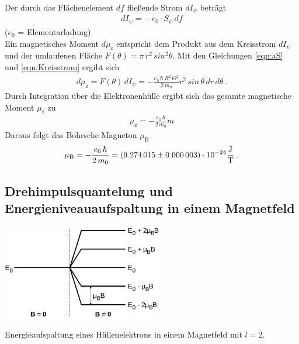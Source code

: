 Der durch das Flächenelement $df$ fließende Strom $dI_\psi$ beträgt
\begin{align}\label{eqn:Kreisstrom} %
	dI_\psi = -\,e_0\cdot S_\psi\,df
\end{align}
\hfill \footnotesize{($e_0$ = Elementarladung)} \hfill \vspace{0.25cm}\\
Ein magnetisches Moment $d\mu_\text{z}$ entspricht dem Produkt aus dem Kreisstrom $dI_\psi$ und der umlaufenen Fläche $F(\theta) = \pi\, r^2\, sin^2\theta$. Mit den Gleichungen \eqref{eqn:aS} und \eqref{eqn:Kreisstrom} ergibt sich
\begin{align}\label{eqn:mM} %
	d\mu_\text{z} = F(\theta)\, dI_\psi = - \frac{e_0\, \hbar\, R^2\, \Theta^2}{2\, m_0} r^2\, sin\,\theta\, dr\, d\theta \ .
\end{align}
Durch Integration über die Elektronenhülle ergibt sich das gesamte magnetische Moment $\mu_\text{z}$ zu
\begin{align}\label{eqn:gmM} %
	\mu_\text{z} = - \frac{e_0\, \hbar}{2\, m_0} m
\end{align}
Daraus folgt das Bohrsche Magneton $\mu_\text{B}$ \cite{V28}
\begin{align}\label{eqn:BM} %
	\mu_\text{B} = - \frac{e_0\, \hbar}{2\, m_0} = (\num{9.274015 +- 0.000003})\cdot 10^{-24} \frac{\text{J}}{\text{T}} \ .
\end{align}



\subsection{Drehimpulsquantelung und Energieniveauaufspaltung in einem Magnetfeld}

\begin{floatingfigure}{7cm}
	\includegraphics[width=7cm]{picture/Energiequantelung.pdf}
  \caption{Energieaufspaltung eines Hüllenelektrons in einem Magnetfeld mit $l = 2$. \cite{V28}}
	\label{fig:Energiequantelung}
\end{floatingfigure}

